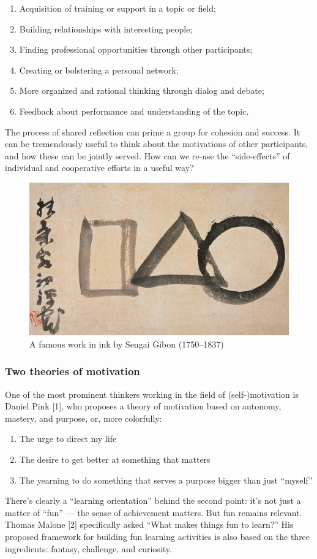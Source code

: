 \begin{enumerate}
\item
  Acquisition of training or support in a topic or field;
\item
  Building relationships with interesting people;
\item
  Finding professional opportunities through other participants;
\item
  Creating or bolstering a personal network;
\item
  More organized and rational thinking through dialog and debate;
\item
  Feedback about performance and understanding of the topic.
\end{enumerate}
The process of shared reflection can prime a group for cohesion and
success. It can be tremendously useful to think about the motivations of
other participants, and how these can be jointly served. How can we
re-use the ``side-effects'' of individual and cooperative efforts in a
useful way?

\begin{figure}
\begin{center}
\includegraphics[width=.8\textwidth]{../pictures/sengai.jpg}
\end{center}
\caption*{A famous work in ink by Sengai Gibon (1750--1837)}
\end{figure}

\subsubsection{Two theories of motivation}

One of the most prominent thinkers working in the field of
(self-)motivation is Daniel Pink {[}1{]}, who proposes a theory of
motivation based on autonomy, mastery, and purpose, or, more colorfully:

\begin{enumerate}
\item
  The urge to direct my life
\item
  The desire to get better at something that matters
\item
  The yearning to do something that serves a purpose bigger than just
  ``myself''
\end{enumerate}
There's clearly a ``learning orientation'' behind the second point: it's
not just a matter of ``fun'' --- the sense of achievement matters. But
fun remains relevant. Thomas Malone {[}2{]} specifically asked ``What
makes things fun to learn?'' His proposed framework for building fun
learning activities is also based on the three ingredients: fantasy,
challenge, and curiosity.

